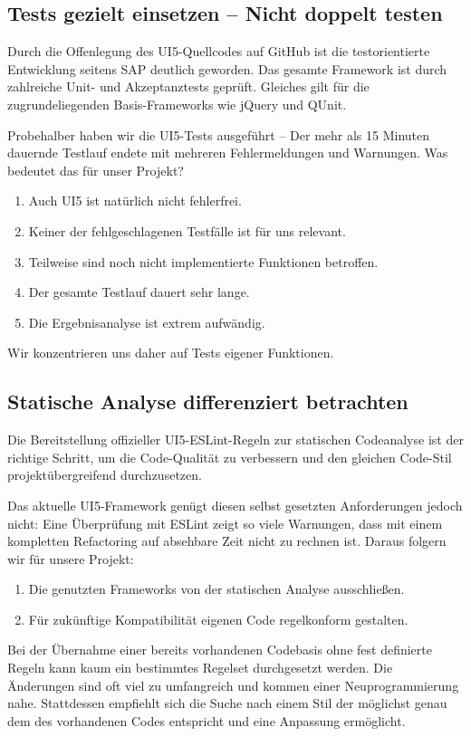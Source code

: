 \subsection{Tests gezielt einsetzen -- Nicht doppelt testen}
Durch die Offenlegung des UI5-Quellcodes auf GitHub ist die testorientierte Entwicklung seitens SAP deutlich geworden. Das gesamte Framework ist durch zahlreiche Unit- und Akzeptanztests geprüft. Gleiches gilt für die zugrundeliegenden Basis-Frameworks wie jQuery und QUnit. 

Probehalber haben wir die UI5-Tests ausgeführt -- Der mehr als 15 Minuten dauernde Testlauf endete mit mehreren Fehlermeldungen und Warnungen. Was bedeutet das für unser Projekt?

\begin{enumerate}
	\item Auch UI5 ist natürlich nicht fehlerfrei.
	\item Keiner der fehlgeschlagenen Testfälle ist für uns relevant.
	\item Teilweise sind noch nicht implementierte Funktionen betroffen.
	\item Der gesamte Testlauf dauert sehr lange.
	\item Die Ergebnisanalyse ist extrem aufwändig.
\end{enumerate}
Wir konzentrieren uns daher auf Tests eigener Funktionen.

\subsection{Statische Analyse differenziert betrachten}
Die Bereitstellung offizieller UI5-ESLint-Regeln zur statischen Codeanalyse ist der richtige Schritt, um die Code-Qualität zu verbessern und den gleichen Code-Stil projektübergreifend durchzusetzen. 

Das aktuelle UI5-Framework genügt diesen selbst gesetzten Anforderungen jedoch nicht: Eine Überprüfung mit ESLint zeigt so viele Warnungen, dass mit einem kompletten Refactoring auf absehbare Zeit nicht zu rechnen ist. Daraus folgern wir für unsere Projekt:
\begin{enumerate}
	\item Die genutzten Frameworks von der statischen Analyse ausschließen.
	\item Für zukünftige Kompatibilität eigenen Code regelkonform gestalten.
\end{enumerate}
Bei der Übernahme einer bereits vorhandenen Codebasis ohne fest definierte Regeln kann kaum ein bestimmtes Regelset durchgesetzt werden. Die Änderungen sind oft viel zu umfangreich und kommen einer Neuprogrammierung nahe. Stattdessen empfiehlt sich die Suche nach einem Stil der möglichst genau dem des vorhandenen Codes entspricht und eine Anpassung ermöglicht.

